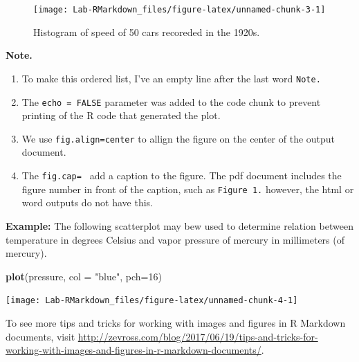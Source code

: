 \documentclass[]{article}
\newenvironment{Shaded}{\begin{snugshade}}{\end{snugshade}}
\newcommand{\DataTypeTok}[1]{\textcolor[rgb]{0.13,0.29,0.53}{#1}}
\newcommand{\DecValTok}[1]{\textcolor[rgb]{0.00,0.00,0.81}{#1}}
\newcommand{\KeywordTok}[1]{\textcolor[rgb]{0.13,0.29,0.53}{\textbf{#1}}}
\newcommand{\NormalTok}[1]{#1}
\newcommand{\StringTok}[1]{\textcolor[rgb]{0.31,0.60,0.02}{#1}}
\providecommand{\tightlist}{%
  \setlength{\itemsep}{0pt}\setlength{\parskip}{0pt}}
\begin{document}
\begin{figure}

{\centering \texttt{[image: Lab-RMarkdown\_files/figure-latex/unnamed-chunk-3-1]} 

}

\caption{Histogram of speed of 50 cars recoreded in the 1920s.}\label{fig:unnamed-chunk-3}
\end{figure}

\textbf{Note.}

\begin{enumerate}
\def\labelenumi{\arabic{enumi}.}
\tightlist
\item
  To make this ordered list, I've an empty line after the last word
  \texttt{Note.}
\item
  The \texttt{echo\ =\ FALSE} parameter was added to the code chunk to
  prevent printing of the R code that generated the plot.\\
\item
  We use \texttt{fig.align=\textquotesingle{}center\textquotesingle{}}
  to allign the figure on the center of the output document.\\
\item
  The \texttt{fig.cap=\textquotesingle{}\ \textquotesingle{}} add a
  caption to the figure. The pdf document includes the figure number in
  front of the caption, such as \texttt{Figure\ 1.} however, the html or
  word outputs do not have this.
\end{enumerate}

\textbf{Example:} The following scatterplot may bew used to determine
relation between temperature in degrees Celsius and vapor pressure of
mercury in millimeters (of mercury).

\begin{Shaded}
\begin{Highlighting}[]
\KeywordTok{plot}\NormalTok{(pressure, }\DataTypeTok{col =} \StringTok{"blue"}\NormalTok{, }\DataTypeTok{pch=}\DecValTok{16}\NormalTok{)}
\end{Highlighting}
\end{Shaded}

\begin{center}\texttt{[image: Lab-RMarkdown\_files/figure-latex/unnamed-chunk-4-1]} \end{center}

To see more tips and tricks for working with images and figures in R
Markdown documents, visit
\url{http://zevross.com/blog/2017/06/19/tips-and-tricks-for-working-with-images-and-figures-in-r-markdown-documents/}.
\end{document}
